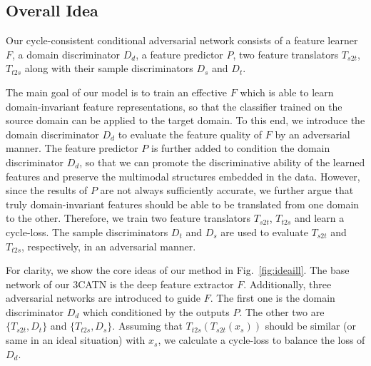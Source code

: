 \documentclass[sigconf]{acmart}
\begin{document}
\subsection{Overall Idea}
Our cycle-consistent conditional adversarial network consists of a feature learner $F$, a domain discriminator $D_d$, a feature predictor $P$, two feature translators $T_{s2t}$, $T_{t2s}$ along with their sample discriminators $D_s$ and $D_t$. 

The main goal of our model is to train an effective $F$ which is able to learn domain-invariant feature representations, so that the classifier trained on the source domain can be applied to the target domain. To this end, we introduce the domain discriminator $D_d$ to evaluate the feature quality of $F$ by an adversarial manner. The feature predictor $P$ is further added to condition the domain discriminator $D_d$, so that we can promote the discriminative ability of the learned features and preserve the multimodal structures embedded in the data. However, since the results of $P$ are not always sufficiently accurate, we further argue that truly domain-invariant features should be able to be translated from one domain to the other. Therefore, we train two feature translators $T_{s2t}$, $T_{t2s}$ and learn a cycle-loss. The sample discriminators $D_t$ and $D_s$ are used to evaluate $T_{s2t}$ and $T_{t2s}$, respectively, in an adversarial manner.

For clarity, we show the core ideas of our method in Fig.~\ref{fig:ideaill}. The base network of our 3CATN is the deep feature extractor $F$. Additionally, three adversarial networks are introduced to guide $F$. The first one is the domain discriminator $D_d$ which conditioned by the outputs $P$. The other two are $\{T_{s2t},D_t\}$ and $\{T_{t2s},D_s\}$. Assuming that $T_{t2s}(T_{s2t}(x_s))$ should be similar (or same in an ideal situation) with $x_s$, we calculate a cycle-loss to balance the loss of $D_d$. 
\end{document}
